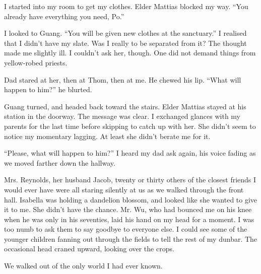 I started into my room to get my clothes. Elder Mattias blocked my way. ``You already have everything you need, Po.''

I looked to Guang. ``You will be given new clothes at the sanctuary.'' I realised that I didn't have my slate. Was I really to be separated from it? The thought made me slightly ill. I couldn't ask her, though. One did not demand things from yellow-robed priests.

Dad stared at her, then at Thom, then at me. He chewed his lip. ``What will happen to him?'' he blurted.

Guang turned, and headed back toward the stairs. Elder Mattias stayed at his station in the doorway. The message was clear. I exchanged glances with my parents for the last time before skipping to catch up with her. She didn't seem to notice my momentary lagging. At least she didn't berate me for it.

``Please, what will happen to him?'' I heard my dad ask again, his voice fading as we moved farther down the hallway.

Mrs. Reynolds, her husband Jacob, twenty or thirty others of the closest friends I would ever have were all staring silently at us as we walked through the front hall. Isabella was holding a dandelion blossom, and looked like she wanted to give it to me. She didn't have the chance. Mr. Wu, who had bounced me on his knee when he was only in his seventies, laid his hand on my head for a moment. I was too numb to ask them to say goodbye to everyone else. I could see some of the younger children fanning out through the fields to tell the rest of my dunbar. The occasional head craned upward, looking over the crops.

We walked out of the only world I had ever known.


\newpage
\thispagestyle{empty}
